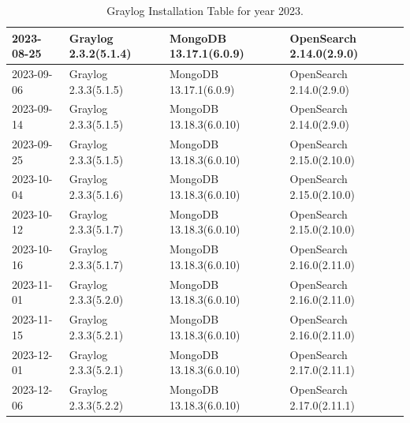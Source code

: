 \documentclass[../main.tex]{subfiles}
\begin{document}
\begin{table}[h]
\begin{tabular}{|l|l|l|l|}
2023-08-25 & Graylog 2.3.2(5.1.4) & MongoDB 13.17.1(6.0.9) & OpenSearch 2.14.0(2.9.0) \\ \hline
2023-09-06 & Graylog 2.3.3(5.1.5) & MongoDB 13.17.1(6.0.9) & OpenSearch 2.14.0(2.9.0) \\ \hline
2023-09-14 & Graylog 2.3.3(5.1.5) & MongoDB 13.18.3(6.0.10) & OpenSearch 2.14.0(2.9.0) \\ \hline
2023-09-25 & Graylog 2.3.3(5.1.5) & MongoDB 13.18.3(6.0.10) & OpenSearch 2.15.0(2.10.0) \\ \hline
2023-10-04 & Graylog 2.3.3(5.1.6) & MongoDB 13.18.3(6.0.10) & OpenSearch 2.15.0(2.10.0) \\ \hline
2023-10-12 & Graylog 2.3.3(5.1.7) & MongoDB 13.18.3(6.0.10) & OpenSearch 2.15.0(2.10.0) \\ \hline
2023-10-16 & Graylog 2.3.3(5.1.7) & MongoDB 13.18.3(6.0.10) & OpenSearch 2.16.0(2.11.0) \\ \hline
2023-11-01 & Graylog 2.3.3(5.2.0) & MongoDB 13.18.3(6.0.10) & OpenSearch 2.16.0(2.11.0) \\ \hline
2023-11-15 & Graylog 2.3.3(5.2.1) & MongoDB 13.18.3(6.0.10) & OpenSearch 2.16.0(2.11.0) \\ \hline
2023-12-01 & Graylog 2.3.3(5.2.1) & MongoDB 13.18.3(6.0.10) & OpenSearch 2.17.0(2.11.1) \\ \hline
2023-12-06 & Graylog 2.3.3(5.2.2) & MongoDB 13.18.3(6.0.10) & OpenSearch 2.17.0(2.11.1) \\ \hline
\end{tabular}
\caption{Graylog Installation Table for year 2023.}
\label{table:installation_table_2023}
\end{table}
\end{document}
